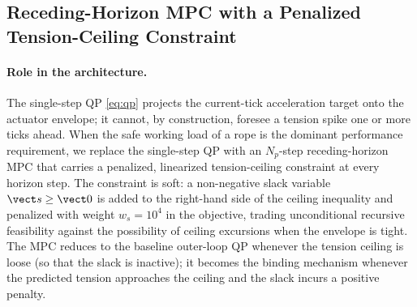 \subsection{Receding-Horizon MPC with a Penalized Tension-Ceiling Constraint}
\label{sec:mpc-layer}

\paragraph{Role in the architecture.} The single-step QP \eqref{eq:qp} projects the current-tick acceleration target onto the actuator envelope; it cannot, by construction, foresee a tension spike one or more ticks ahead. When the safe working load of a rope is the dominant performance requirement, we replace the single-step QP with an $N_p$-step receding-horizon MPC that carries a penalized, linearized tension-ceiling constraint at every horizon step. The constraint is soft: a non-negative slack variable $\vect s \ge \vect 0$ is added to the right-hand side of the ceiling inequality and penalized with weight $w_s = 10^4$ in the objective, trading unconditional recursive feasibility against the possibility of ceiling excursions when the envelope is tight. The MPC reduces to the baseline outer-loop QP whenever the tension ceiling is loose (so that the slack is inactive); it becomes the binding mechanism whenever the predicted tension approaches the ceiling and the slack incurs a positive penalty.

